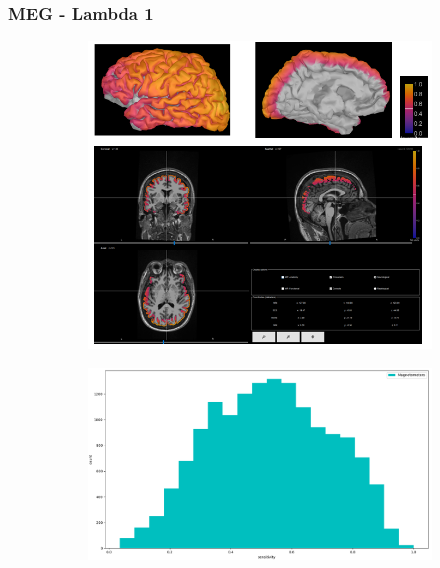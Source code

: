 \documentclass{beamer}
\numberwithin{figure}{section}
\numberwithin{equation}{section}
\begin{document}
\section{}
\begin{frame}
 \frametitle{MEG - Lambda 1}
  

 	\begin{figure}[h]
        \begin{subfigure}[h]{0.53\linewidth} 
            \includegraphics[width=\linewidth]{pictures/meg3}
            \label{fig:rdf_graph}
        \end{subfigure}       
        \begin{subfigure}[h]{0.45\linewidth} 
            \includegraphics[width=\linewidth]{pictures/HISTmeg0.png}
            \label{fig:rdfs_graph}
        \end{subfigure}
    \end{figure}

  
\end{frame}
\end{document}
